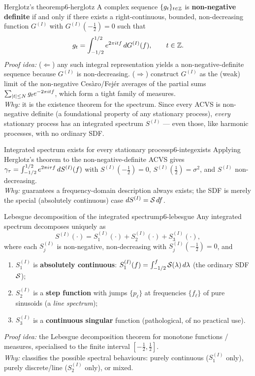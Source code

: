 \begin{theorem}{Herglotz's theorem}{p6-herglotz}
A complex sequence $\{g_t\}_{t\in\mathbb{Z}}$ is \textbf{non-negative definite} if
and only if there exists a right-continuous, bounded, non-decreasing function
$G^{(I)}$ with $G^{(I)}(-\tfrac12)=0$ such that
\[
g_t=\int_{-1/2}^{1/2} e^{2\pi i t f}\,dG^{(I)}(f),\qquad t\in\mathbb{Z} .
\]
\textit{Proof idea:} ($\Leftarrow$) any such integral representation yields a
non-negative-definite sequence because $G^{(I)}$ is non-decreasing.
($\Rightarrow$) construct $G^{(I)}$ as the (weak) limit of the non-negative
Ces\`aro/Fej\'er averages of the partial sums $\sum_{\left\lvert t \right\rvert\le N} g_t
e^{-2\pi i t f}$, which form a tight family of measures.\\
\textit{Why:} it is the existence theorem for the spectrum. Since every ACVS is
non-negative definite (a foundational property of any stationary process),
\emph{every} stationary process has an integrated spectrum $S^{(I)}$ --- even
those, like harmonic processes, with no ordinary SDF.
\end{theorem}

\begin{corollary}{Integrated spectrum exists for every stationary process}{p6-integexists}
Applying Herglotz's theorem to the non-negative-definite ACVS gives
$\gamma_\tau=\int_{-1/2}^{1/2}e^{2\pi i \tau f}\,dS^{(I)}(f)$ with
$S^{(I)}(-\tfrac12)=0$, $S^{(I)}(\tfrac12)=\sigma^2$, and $S^{(I)}$
non-decreasing.\\[2pt]
\textit{Why:} guarantees a frequency-domain description always exists; the SDF
is merely the special (absolutely continuous) case $dS^{(I)}=\mathcal{S}\,df$.
\end{corollary}

\begin{theorem}{Lebesgue decomposition of the integrated spectrum}{p6-lebesgue}
Any integrated spectrum decomposes uniquely as
\[
S^{(I)}(\cdot)=S^{(I)}_1(\cdot)+S^{(I)}_2(\cdot)+S^{(I)}_3(\cdot),
\]
where each $S^{(I)}_j$ is non-negative, non-decreasing with
$S^{(I)}_j(-\tfrac12)=0$, and
\begin{enumerate}
  \item $S^{(I)}_1$ is \textbf{absolutely continuous}:
        $S^{(I)}_1(f)=\int_{-1/2}^{f}\mathcal{S}(\lambda)\,d\lambda$ (the ordinary SDF
        $\mathcal{S}$);
  \item $S^{(I)}_2$ is a \textbf{step function} with jumps $\{p_\ell\}$ at
        frequencies $\{f_\ell\}$ of pure sinusoids (a \emph{line spectrum});
  \item $S^{(I)}_3$ is a \textbf{continuous singular} function (pathological,
        of no practical use).
\end{enumerate}
\textit{Proof idea:} the Lebesgue decomposition theorem for monotone functions
/ measures, specialised to the finite interval $[-\tfrac12,\tfrac12]$.\\
\textit{Why:} classifies the possible spectral behaviours: purely continuous
($S^{(I)}_1$ only), purely discrete/line ($S^{(I)}_2$ only), or mixed.
\end{theorem}

